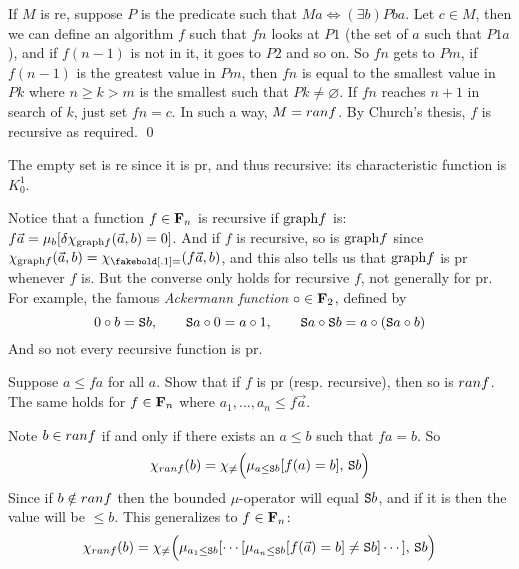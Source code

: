 If $M$ is re, suppose $P$ is the predicate such that $Ma\iff(\exists b)Pba$.
Let $c\in M$, then we can define an algorithm $f$ such that $fn$ looks at $P1$ (the set of $a$ such that $P1a$), and if $f(n-1)$ is not in it, it goes to $P2$ and so on.
So $fn$ gets to $Pm$, if $f(n-1)$ is the greatest value in $Pm$, then $fn$ is equal to the smallest value in $Pk$ where $n\geq k>m$ is the smallest such that $Pk\neq\varnothing$.
If $fn$ reaches $n+1$ in search of $k$, just set $fn=c$.
In such a way, $M={\sl ran}f$.
By Church's thesis, $f$ is recursive as required.
\qed

The empty set is re since it is pr, and thus recursive: its characteristic function is $K^1_0$.

Notice that a function $f\in{\bf F}_n$ is recursive if ${\rm graph}f$ is: $f\vec a=\mu_b[\delta\chi_{{\rm graph}f}(\vec a,b)=0]$.
And if $f$ is recursive, so is ${\rm graph}f$ since $\chi_{{\rm graph}f}(\vec a,b)=\chi_{\eq}(f\vec a,b)$, and this also tells us that ${\rm graph}f$ is pr whenever $f$ is.
But the converse only holds for recursive $f$, not generally for pr.
For example, the famous {\it Ackermann function} $\circ\in{\bf F}_2$, defined by
$$ 0\circ b={\tt S}b,\qquad {\tt S}a\circ0=a\circ1,\qquad {\tt S}a\circ{\tt S}b=a\circ({\tt S}a\circ b) $$
And so not every recursive function is pr.

\bexerc

    Suppose $a\leq fa$ for all $a$.
    Show that if $f$ is pr (resp. recursive), then so is ${\sl ran}f$.
    The same holds for $f\in{\bf F}_n$ where $a_1,\dots,a_n\leq f\vec a$.

\eexerc

Note $b\in{\sl ran}f$ if and only if there exists an $a\leq b$ such that $fa=b$.
So
$$ \chi_{{\sl ran}f}(b) = \chi_{\neq}\Bigl(\mu_{a\leq{\tt S}b}[f(a)=b],\,{\tt S}b\Bigr) $$
Since if $b\notin{\sl ran}f$ then the bounded $\mu$-operator will equal ${\tt S}b$, and if it is then the value will be $\leq b$.
This generalizes to $f\in{\bf F}_n$:
$$ \chi_{{\sl ran}f}(b) = \chi_{\neq}\Bigl(\mu_{a_1\leq{\tt S}b}[\cdots[\mu_{a_n\leq{\tt S}b}[f(\vec a)=b]\neq{\tt S}b]\cdots],\,{\tt S}b\Bigr) $$

